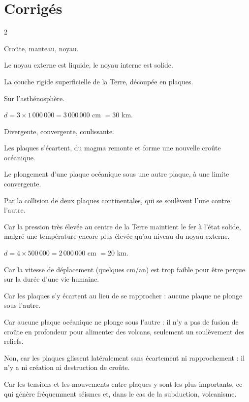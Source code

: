 \section{Corrigés}
\begin{multicols}{2}

Croûte, manteau, noyau.

Le noyau externe est liquide, le noyau interne est solide.

La couche rigide superficielle de la Terre, découpée en plaques.

Sur l'asthénosphère.

$d=3\times1\,000\,000=3\,000\,000$ cm $=30$ km.

Divergente, convergente, coulissante.

Les plaques s'écartent, du magma remonte et forme une nouvelle croûte océanique.

Le plongement d'une plaque océanique sous une autre plaque, à une limite convergente.

Par la collision de deux plaques continentales, qui se soulèvent l'une contre l'autre.

Car la pression très élevée au centre de la Terre maintient le fer à l'état solide,
malgré une température encore plus élevée qu'au niveau du noyau externe.

$d=4\times500\,000=2\,000\,000$ cm $=20$ km.

Car la vitesse de déplacement (quelques cm/an) est trop faible pour être perçue sur la
durée d'une vie humaine.

Car les plaques s'y écartent au lieu de se rapprocher : aucune plaque ne plonge sous
l'autre.

Car aucune plaque océanique ne plonge sous l'autre : il n'y a pas de fusion de croûte en
profondeur pour alimenter des volcans, seulement un soulèvement des reliefs.

Non, car les plaques glissent latéralement sans écartement ni rapprochement : il n'y a
ni création ni destruction de croûte.

Car les tensions et les mouvements entre plaques y sont les plus importants, ce qui
génère fréquemment séismes et, dans le cas de la subduction, volcanisme.


\end{multicols}

